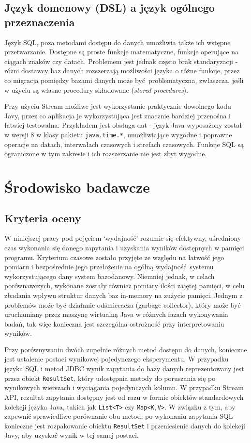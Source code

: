 \documentclass[12pt]{extarticle}
\begin{document}
\subsection{Język domenowy (DSL) a język ogólnego przeznaczenia}

    Język SQL, poza metodami dostępu do danych umożliwia także ich wstępne przetwarzanie. Dostępne są proste funkcje matematyczne, funkcje operujące na ciągach znaków czy datach. Problemem jest jednak często brak standaryzacji - różni dostawcy baz danych rozszerzają możliwości języka o różne funkcje, przez co migracja pomiędzy bazami danych może być problematyczna, zwłaszcza, jeśli w użyciu są własne procedury składowane (\textit{stored procedures}). 
    
    Przy użyciu Stream możliwe jest wykorzystanie praktycznie dowolnego kodu Javy, przez co aplikacja je wykorzystująca jest znacznie bardziej przenośna i łatwiej testowalna. Przykładem jest obsługa dat - język Java wyposażony został w wersji 8 w klasy pakietu \texttt{java.time.*}, umożliwiające wygodne i poprawne operacje na datach, interwałach czasowych i strefach czasowych. Funkcje SQL są ograniczone w tym zakresie i ich rozszerzanie nie jest zbyt wygodne.
    

\section{Środowisko badawcze}

\subsection{Kryteria oceny}

    W niniejszej pracy pod pojęciem `wydajność' rozumie się efektywny, uśredniony czas wykonania się danego zapytania i uzyskania wyników dostępnych w pamięci programu. Kryterium czasowe zostało przyjęte ze względu na łatwość jego pomiaru i bezpośrednie jego przełożenie na ogólną wydajność systemu wykorzystującego dany system bazodanowy. Niemniej jednak, w celach porównawczych, wykonane zostały również pomiary ilości zajętej pamięci, w celu zbadania wpływu struktur danych baz in-memory na zużycie pamięci. Jednym z problemów może być działanie odśmiecacza (garbage collector), który może być uruchamiany przez maszynę wirtualną Java w różnych fazach wykonywania badań, tak więc konieczna jest szczególna ostrożność przy interpretowaniu wyników.

    Przy porównywaniu dwóch zupełnie różnych metod dostępu do danych, konieczne jest ustalenie postaci wynikowej pojedynczego eksperymentu. W przypadku języka SQL i metod JDBC wynik zapytania do bazy danych reprezentowany jest przez obiekt \texttt{ResultSet}, który udostępnia metody do poruszania się po wynikowych wierszach i wyciągania pojedynczych kolumn. W przypadku Stream API, rezultat zapytania dostępny jest od razu w formie obiektów standardowych kolekcji języka Java, takich jak \texttt{List<T>} czy \texttt{Map<K,V>}. W związku z tym, aby zapewnić sprawiedliwe porównanie obu metod, po wykonaniu zapytania SQL konieczne jest rozpakowanie obiektu \texttt{ResultSet} i przeniesienie danych do kolekcji Javy, aby uzyskać wynik w tej samej postaci.
\end{document}
